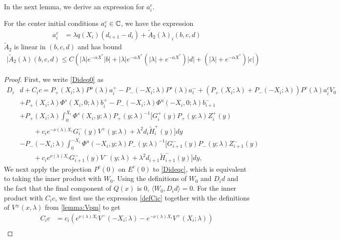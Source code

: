 \documentclass[thesis.tex]{subfiles}
\begin{document}
In the next lemma, we derive an expression for $a_i^c$.

\begin{lemma}\label{lemma:ac1}
For the center initial conditions $a_i^c \in \mathbb{C}$, we have the expression
\begin{align}\label{tildeciexp1}
a_i^c &= \lambda q(X_i) (d_{i+1} - d_i ) + \tilde{A}_2(\lambda)_i(b, c, d)
\end{align}
$\tilde{A}_2$ is linear in $(b, c, d)$ and has bound
\begin{align}\label{tildeA2bound}
|\tilde{A}_2(\lambda)(b, c, d) \leq C \left( |\lambda| e^{-\alpha X^*} |b| + |\lambda| e^{-\alpha X^*} (|\lambda| + e^{-\alpha X^*}) |d| + (|\lambda| + e^{-\alpha X^*})|c| \right)
\end{align}

\begin{proof}
First, we write \cref{Dideq0} as
\begin{equation}\label{Dideqc}
\begin{aligned}
D_i &d + C_i c = P_+(X_i; \lambda)P^u(\lambda) a_i^+ - P_-(-X_i; \lambda)P^s(\lambda) a_i^- + (P_+(X_i; \lambda) +  P_-(-X_i; \lambda)) P^c(\lambda) a_i^c V_0 \\
&+ P_+(X_i; \lambda)\Phi^s(X_i, 0; \lambda) b_i^+ - P_-(-X_i; \lambda)\Phi^u(-X_i, 0; \lambda) b_{i+1}^- \\
&+ P_+(X_i; \lambda) \int_0^{X_i} \Phi^s(X_i, y; \lambda) P_+(y; \lambda)^{-1}\big[ G_i^+(y) P_+(y; \lambda) Z_i^+(y) \\
&\qquad+ c_i e^{-\nu(\lambda)X_i} G_i^-(y) V^+(y; \lambda) + \lambda^2 d_i \tilde{H}_i^+(y)\big] dy \\ 
&- P_-(-X_i; \lambda) \int_0^{-X_i} \Phi^u(-X_i, y; \lambda) P_-(y; \lambda)^{-1}\big[ G_{i+1}^-(y) P_-(y; \lambda)Z_{i+1}^-(y) \\
&\qquad+ c_i e^{\nu(\lambda)X_i} G_{i+1}^-(y) V^-(y; \lambda) + \lambda^2 d_{i+1} \tilde{H}_{i+1}^-(y)\big] dy,
\end{aligned}
\end{equation}
We next apply the projection $P^c(0)$ on $E^c(0)$ to \eqref{Dideqc}, which is equivalent to taking the inner product with $W_0$. Using the definitions of $W_0$ and $D_i d$ and the fact that the final component of $Q(x)$ is 0, $\langle W_0, D_i d\rangle = 0$. For the inner product with $C_i c$, we first use the expression \cref{defCic} together with the definitions of $V^\pm(x, \lambda)$ from \cref{lemma:Vpm} to get
\begin{align*}
C_i c &= c_i \left( e^{\nu(\lambda) X_i} V^-(-X_i; \lambda) - e^{-\nu(\lambda) X_i} V^+(X_i; \lambda) \right) \\

\end{align*}
\end{proof}
\end{lemma}
\end{document}
